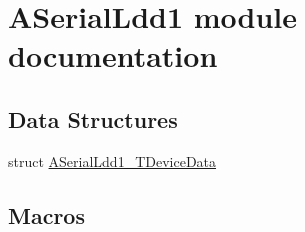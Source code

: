 \hypertarget{group___a_serial_ldd1__module}{}\section{A\+Serial\+Ldd1 module documentation}
\label{group___a_serial_ldd1__module}
\subsection*{Data Structures}
\begin{DoxyCompactItemize}
\item 
struct \hyperlink{struct_a_serial_ldd1___t_device_data}{A\+Serial\+Ldd1\+\_\+\+T\+Device\+Data}
\end{DoxyCompactItemize}
\subsection*{Macros}
